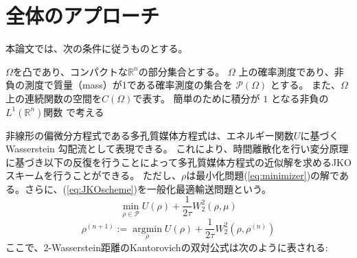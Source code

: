 \begin{comment}
研究では、以下の研究内容を検討します。

* BFM を PME に適用するための一般化
* 提案するソルバーの効率性の評価
* 提案するソルバーの他のソルバーとの比較

BFM を PME に適用するためには、以下の点に留意する必要があります。

* PME は、剛性があり非線形な方程式であるため、BFM の解法の適応が必要となる。
* PME の境界条件は、通常、PDE の解法に固有の形状となる。BFM の解法では、これらの境界条件をどのように扱うかが課題となる。

提案するソルバーの効率性を評価するためには、以下の点に留意する必要があります。

* ソルバーの収束精度と収束速度を評価する。
* ソルバーの計算コストを評価する。

提案するソルバーと他のソルバーとの比較を行うためには、以下の点に留意する必要があります。

* ソルバーの収束精度と収束速度を比較する。
* ソルバーの計算コストを比較する。

本研究では、これらの点に留意して、提案するソルバーの有効性を検証します。

\end{comment}
















\section{全体のアプローチ}
\label{sect:全体のアプローチ}
本論文では、次の条件に従うものとする。
{\color{red}
\begin{ass}
\label{ass:1}
    $\Omega$を凸であり、コンパクトな$\mathbb{R}^n$の部分集合とする。
    $\Omega$ 上の確率測度であり、非負の測度で質量（mass）が1である確率測度の集合を $\mathcal{P} (\Omega)$ とする。
    また、$\Omega$上の連続関数の空間を$C(\Omega)$で表す。
    簡単のために積分が \(1\) となる非負の \(L^1(\mathbb{R}^n)\)関数 で考える
\end{ass}
}

非線形の偏微分方程式である多孔質媒体方程式は、エネルギー関数$U$に基づくWasserstein 勾配流として表現できる。
これにより、時間離散化を行い変分原理に基づき以下の反復を行うことによって多孔質媒体方程式の近似解を求めるJKOスキームを行うことができる。
ただし、$\rho$は最小化問題(\ref{eq:minimizer})の解である。さらに、(\ref{eq:JKOscheme})を一般化最適輸送問題という。
\begin{equation}
    \label{eq:minimizer}
    \min_{\rho \in \mathcal{P}} U(\rho) + \frac{1}{2\tau} W_2^2(\rho, \mu)
\end{equation}
\begin{equation}
    \label{eq:JKOscheme}
    \rho^{(n+1)} := \underset{\rho}{\operatorname{argmin}} U(\rho) + \frac{1}{2\tau} W_2^2(\rho, \rho^{(n)})
\end{equation}
ここで、2-Wasserstein距離のKantorovichの双対公式は次のように表される:

